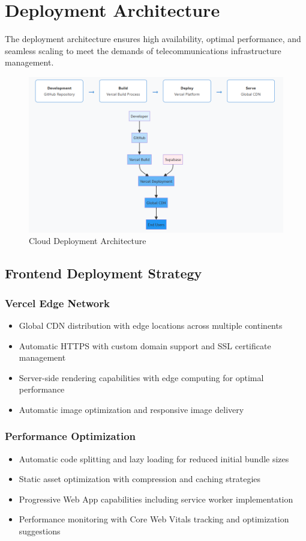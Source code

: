 \section{Deployment Architecture}

The deployment architecture ensures high availability, optimal performance, and seamless scaling to meet the demands of telecommunications infrastructure management.

\begin{figure}[H]
    \centering
    \includegraphics[width=0.85\linewidth]{img/chap_02/deployment_architecture.png}
    \caption{Cloud Deployment Architecture}
    \label{fig:deployment_architecture}
\end{figure}

\subsection{Frontend Deployment Strategy}

\subsubsection{Vercel Edge Network}
\begin{itemize}
\item Global CDN distribution with edge locations across multiple continents
\item Automatic HTTPS with custom domain support and SSL certificate management
\item Server-side rendering capabilities with edge computing for optimal performance
\item Automatic image optimization and responsive image delivery
\end{itemize}

\subsubsection{Performance Optimization}
\begin{itemize}
\item Automatic code splitting and lazy loading for reduced initial bundle sizes
\item Static asset optimization with compression and caching strategies
\item Progressive Web App capabilities including service worker implementation
\item Performance monitoring with Core Web Vitals tracking and optimization suggestions
\end{itemize}

